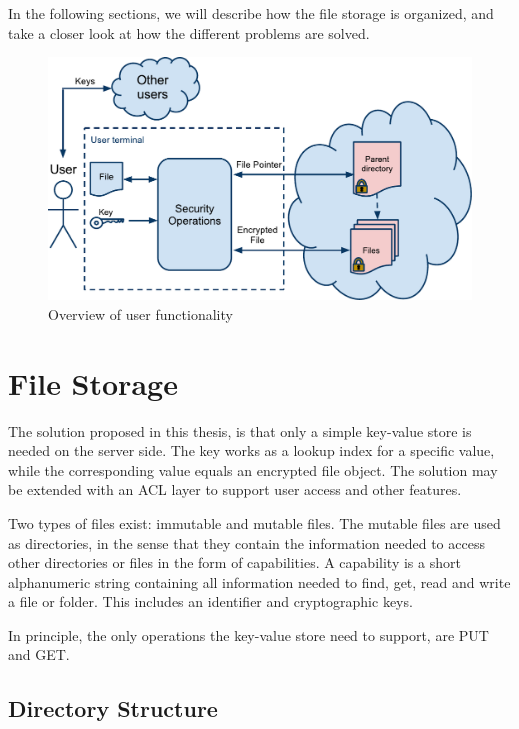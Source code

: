 \documentclass[pdftex,english,10pt,b5paper,twoside]{book}
\begin{document}
In the following sections, we will describe how the file storage is organized,
and take a closer look at how the different problems are solved.

\begin{figure}[h!]
    \centering
    \includegraphics[width=\columnwidth]{ArchitectureOverview.pdf}
    \caption{Overview of user functionality}
    \label{fig:AS:overview}
\end{figure}

\section{File Storage}
\label{sec:AS:FS}

The solution proposed in this thesis, is that only a simple key-value store is
needed on the server side. The key works as a lookup index for a specific value,
while the corresponding value equals an encrypted file object. The solution may
be extended with an \ac{ACL} layer to support user access and other features.

Two types of files exist: immutable and mutable files. The mutable files are used
as directories, in the sense that they contain the information needed to access
other directories or files in the form of capabilities.
A capability is a short alphanumeric string containing all information needed
to find, get, read and write a file or folder. This includes an identifier and
cryptographic keys.

In principle, the only operations the key-value store need to support, are
PUT and GET.

\subsection{Directory Structure}
\end{document}
